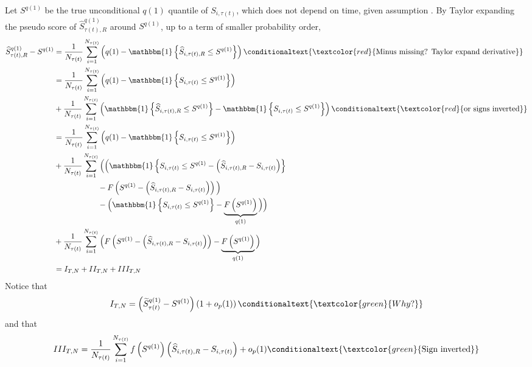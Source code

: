 Let $S^{q(1)}$ be the true unconditional $q(1)$ quantile of $S_{i,\tau(t)}$, which does not depend on time, given assumption . By Taylor expanding the pseudo score of $\widehat{S}_{\tau(t),R}^{q(1)}$ around $S^{q(1)}$, up to a term of smaller probability order, 
\begin{align*}
\widehat{S}_{\tau(t),R}^{q(1)}-S^{q(1)} &= \frac{1}{N_{\tau(t)}}\sum_{i=1}^{N_{\tau(t)}}\left( q(1)-\mathbbm{1} \left\{ \widehat{S}_{i,\tau(t),R}\leq S^{q(1)}\right\} \right) \conditionaltext{\textcolor{red}{\text{Minus missing? Taylor expand derivative}}} \\
&= \frac{1}{N_{\tau(t)}}\sum_{i=1}^{N_{\tau(t)}}\left( q(1)-\mathbbm{1} \left\{ S_{i,\tau(t)}\leq S^{q(1)}\right\} \right)  \\
& +\frac{1}{N_{\tau(t)}}\sum_{i=1}^{N_{\tau(t)}}\left( \mathbbm{1} \left\{ \widehat{S}_{i,\tau(t),R}\leq S^{q(1)}\right\} - \mathbbm{1} \left\{ S_{i,\tau(t)}\leq S^{q(1)}\right\} \right) \conditionaltext{\textcolor{red}{\text{or signs inverted}}} \\
&= \frac{1}{N_{\tau(t)}}\sum_{i=1}^{N_{\tau(t)}} \left( q(1)-\mathbbm{1} \left\{ S_{i,\tau(t)}\leq S^{q(1)}\right\} \right) \\
& +\frac{1}{N_{\tau(t)}}\sum_{i=1}^{N_{\tau(t)}} \Big( \Big( \mathbbm{1} \left\{ S_{i,\tau(t)}\leq S^{q(1)}-\left( \widehat{S}_{i,\tau(t),R}-S_{i,\tau(t) }\right) \right\} \\
& \hspace{2cm} -F \left( S^{q(1)}-\left( \widehat{S}_{i,\tau(t),R}-S_{i,\tau(t)}\right) \right) \Big) \\
& \hspace{2cm} - \Big( \mathbbm{1} \left\{ S_{i,\tau(t)}\leq S^{q(1)}\right\} -\underbrace{F\left( S^{q(1)}\right) }_{q(1)} \Big) \Big)  \\
& +\frac{1}{N_{\tau(t)}} \sum_{i=1}^{N_{\tau(t)}} \Big( F\left( S^{q(1)}-\left( \widehat{S}_{i,\tau(t),R}-S_{i,\tau(t)}\right) \right) -\underbrace{F\left( S^{q(1)}\right) }_{q(1)} \Big)  \\
&= I_{T,N} + II_{T,N} + III_{T,N}
\end{align*}
Notice that 
\begin{align*}
I_{T,N}=\left( \widetilde{S}_{\tau(t)}^{q(1)}-S^{q(1)}\right) \left( 1+o_{p}(1)\right) \conditionaltext{\textcolor{green}{Why?}}
\end{align*}
and that 
\begin{align*}
III_{T,N}=\frac{1}{N_{\tau(t)}}\sum_{i=1}^{N_{\tau(t)}}f\left(S^{q(1)}\right) \left( \widehat{S}_{i,\tau(t),R}-S_{i,\tau(t)}\right) +o_{p}(1) \conditionaltext{\textcolor{green}{\text{Sign inverted}}}
\end{align*}
